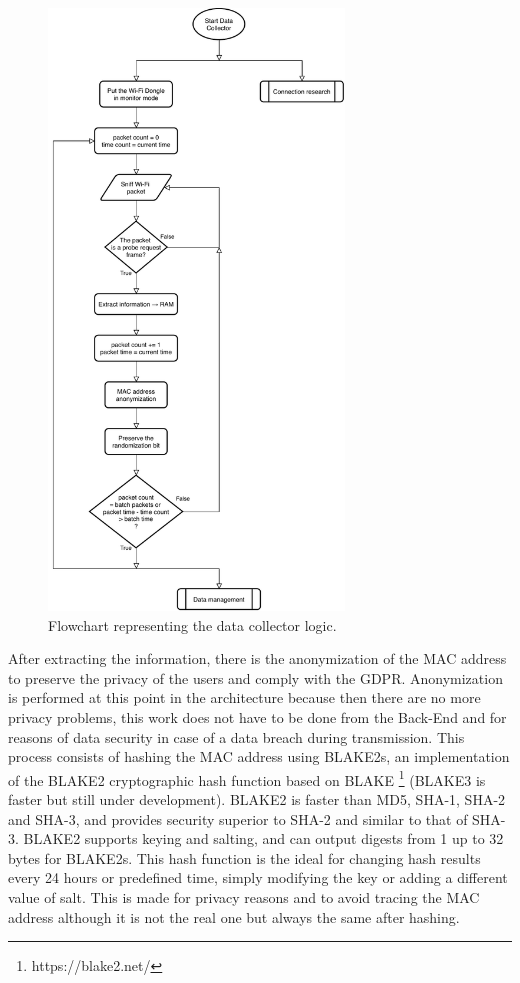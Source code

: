 \begin{figure}[h]
\centering 
\includegraphics[width=0.7\textwidth]{images/flowcollect} 
\caption{Flowchart representing the data collector logic.}
\label{fig:flowcollect}
\end{figure}

After extracting the information, there is the anonymization of the MAC address to preserve the privacy of the users and comply with the GDPR. Anonymization is performed at this point in the architecture because then there are no more privacy problems, this work does not have to be done from the Back-End and for reasons of data security in case of a data breach during transmission.
This process consists of hashing the MAC address using BLAKE2s, an implementation of the BLAKE2  cryptographic hash function based on BLAKE  \footnote{https://blake2.net/} (BLAKE3 is faster but still under development). BLAKE2 is faster than MD5, SHA-1, SHA-2 and SHA-3, and provides security superior to SHA-2 and similar to that of SHA-3. BLAKE2 supports keying and salting, and can output digests from 1 up to 32 bytes for BLAKE2s. This hash function is the ideal for changing hash results every 24 hours or predefined time, simply modifying the key or adding a different value of salt. This is made for privacy reasons and to avoid tracing the MAC address although it is not the real one but always the same after hashing.

